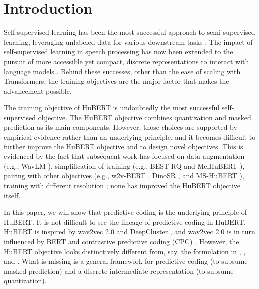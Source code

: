 \section{Introduction}

Self-supervised learning has been the most successful approach to semi-supervised learning, leveraging unlabeled data for various downstream tasks \citep{zhang2022bigssl}.
The impact of self-supervised learning in speech processing has now been extended to the pursuit of more accessible yet compact, discrete representations to interact with language models \citep{lakhotia2021generative,borsos2023audiolm,wang2023neural}.
Behind these successes, other than the ease of scaling with Transformers, the training objectives are the major factor that makes the advancement possible.

The training objective of HuBERT \citep{hsu2021hubert} is undoubtedly the most successful self-supervised objective.
The HuBERT objective combines quantization and masked prediction as its main components.
However, those choices are supported by empirical evidence rather than an underlying principle, and it becomes difficult to further improve the HuBERT objective and to design novel objectives.
This is evidenced by the fact that subsequent work has focused on data augmentation (e.g., WavLM \citep{chen2022wavlm}), simplification of training (e.g., BEST-RQ \citep{chiu2022self} and MelHuBERT \citep{lin2022melhubert}), 
pairing with other objectives (e.g., w2v-BERT \citep{chung2021w2v}, DinoSR \citep{liu2024dinosr}, 
and MS-HuBERT \citep{yadav2024ms}), 
training with different resolution \citep{shi2023multi}; none has improved the HuBERT objective itself.

In this paper, we will show that predictive coding is the underlying principle of HuBERT.
It is not difficult to see the lineage of predictive coding in HuBERT.
HuBERT is inspired by wav2vec 2.0 \citep{baevski2020wav2vec} and DeepCluster \citep{caron2018deep}, 
and wav2vec 2.0 is in turn influenced by BERT \citep{devlin2018bert} and contrastive predictive coding (CPC) \citep{oord2018representation}.
However, the HuBERT objective looks distinctively different from, say, the formulation in \citet{atal1971speech}, \citet{srinivasan1982predictive}, and \citet{rao1999predictive}.
What is missing is a general framework for predictive coding (to subsume masked prediction) and a discrete intermediate representation (to subsume quantization).

